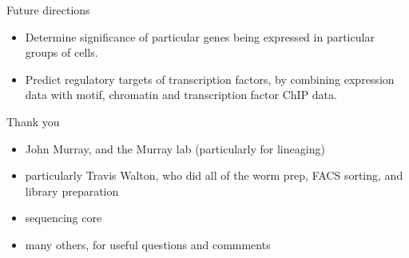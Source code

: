 \documentclass[serif,9pt]{beamer}
\begin{document}
\begin{frame}{Future directions}

\begin{itemize}

\item Determine significance of particular genes being expressed in particular
groups of cells.

\item Predict regulatory targets of transcription factors, by combining
expression data with motif, chromatin and transcription factor ChIP data.

\end{itemize}

\end{frame}

\begin{frame}{Thank you}

\begin{itemize}

\item John Murray, and the Murray lab (particularly for lineaging)

\item particularly Travis Walton, who did all of the worm prep, FACS sorting,
and library preparation

\item sequencing core

\item many others, for useful questions and commments

\end{itemize}

\end{frame}
\end{document}
